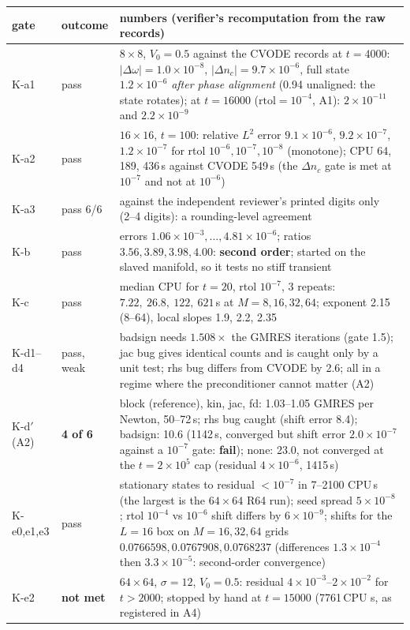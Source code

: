 \documentclass[11pt,a4paper]{article}
\begin{document}
\begin{center}\small
\begin{tabular}{@{}p{}p{}p{}@{}}
\toprule
gate & outcome & numbers (verifier's recomputation from the raw records) \\ \midrule
K-a1 & pass & $8\times8$, $V_0=0.5$ against the CVODE records at $t=4000$: $|\Delta\omega|=1.0\times10^{-8}$, $|\Delta n_c|=9.7\times10^{-6}$,
full state $1.2\times10^{-6}$ \emph{after phase alignment} (0.94 unaligned: the state rotates); at $t=16000$ ($\mathrm{rtol}=10^{-4}$, A1): $2\times10^{-11}$ and $2.2\times10^{-9}$ \\
K-a2 & pass & $16\times16$, $t=100$: relative $L^2$ error $9.1\times10^{-6}$, $9.2\times10^{-7}$, $1.2\times10^{-7}$ for rtol $10^{-6},10^{-7},10^{-8}$
(monotone); CPU 64, 189, 436\,s against CVODE 549\,s (the $\Delta n_c$ gate is met at $10^{-7}$ and not at $10^{-6}$) \\
K-a3 & pass 6/6 & against the independent reviewer's printed digits only (2--4 digits): a rounding-level agreement \\
K-b & pass & errors $1.06\times10^{-3},\ldots,4.81\times10^{-6}$; ratios $3.56,3.89,3.98,4.00$: \textbf{second order}; started on the slaved
manifold, so it tests no stiff transient \\
K-c & pass & median CPU for $t=20$, rtol $10^{-7}$, 3 repeats: $7.22,\ 26.8,\ 122,\ 621$\,s at $M=8,16,32,64$; exponent 2.15 (8--64), local slopes 1.9, 2.2, 2.35 \\
K-d1--d4 & pass, weak & badsign needs $1.508\times$ the GMRES iterations (gate 1.5); jac bug gives identical counts and is caught only by a unit test; rhs bug
differs from CVODE by 2.6; all in a regime where the preconditioner cannot matter (A2) \\
K-d$'$ (A2) & \textbf{4 of 6} & block (reference), kin, jac, fd: 1.03--1.05 GMRES per Newton, 50--72\,s; rhs bug caught (shift error 8.4); badsign: 10.6 (1142\,s, converged but shift error $2.0\times10^{-7}$ against a $10^{-7}$ gate: \textbf{fail}); none: 23.0, not converged at the
$t=2\times10^5$ cap (residual $4\times10^{-6}$, 1415\,s) \\
K-e0,e1,e3 & pass & stationary states to residual $<10^{-7}$ in 7--2100 CPU\,s (the largest is the $64\times64$ R64 run); seed spread $5\times10^{-8}$; rtol $10^{-4}$ vs $10^{-6}$ shift differs by $6\times10^{-9}$;
shifts for the $L=16$ box on $M=16,32,64$ grids $0.0766598, 0.0767908, 0.0768237$ (differences $1.3\times10^{-4}$ then $3.3\times10^{-5}$: second-order convergence) \\
K-e2 & \textbf{not met} & $64\times64$, $\sigma=12$, $V_0=0.5$: residual $4\times10^{-3}$--$2\times10^{-2}$ for $t>2000$; stopped by hand at
$t=15000$ (7761\,CPU s, as registered in A4) \\
\bottomrule
\end{tabular}
\end{center}
\end{document}
